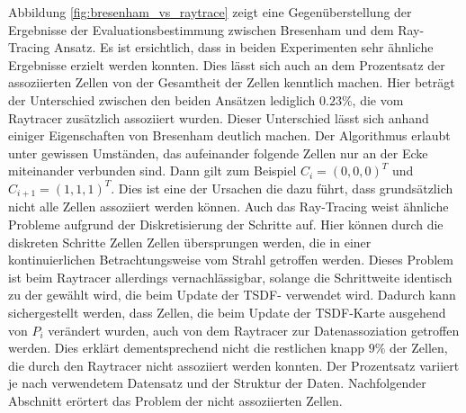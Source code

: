 Abbildung \ref{fig:bresenham_vs_raytrace} zeigt eine Gegenüberstellung der Ergebnisse der Evaluationsbestimmung zwischen Bresenham und dem Ray-Tracing Ansatz. Es ist ersichtlich, dass in beiden Experimenten sehr ähnliche Ergebnisse erzielt werden konnten. Dies lässt sich auch an dem Prozentsatz der assoziierten Zellen von der Gesamtheit der Zellen kenntlich machen. Hier beträgt der Unterschied zwischen den beiden Ansätzen lediglich $0.23 \%$, die vom Raytracer zusätzlich assoziiert wurden. Dieser Unterschied lässt sich anhand einiger Eigenschaften von Bresenham deutlich machen. Der Algorithmus erlaubt unter gewissen Umständen, das aufeinander folgende Zellen nur an der Ecke miteinander verbunden sind. Dann gilt zum Beispiel  $C_i = (0,0,0)^T$ und $C_{i+1} = (1,1,1)^T$. Dies ist eine der Ursachen die dazu führt, dass grundsätzlich nicht alle Zellen assoziiert werden können. Auch das Ray-Tracing weist ähnliche Probleme aufgrund der Diskretisierung der Schritte auf. Hier können durch die diskreten Schritte Zellen Zellen übersprungen werden, die in einer kontinuierlichen Betrachtungsweise vom Strahl getroffen werden. Dieses Problem ist beim Raytracer allerdings vernachlässigbar, solange die Schrittweite identisch zu der gewählt wird, die beim Update der TSDF- verwendet wird. Dadurch kann sichergestellt werden, dass Zellen, die beim Update der TSDF-Karte ausgehend von $P_i$ verändert wurden, auch von dem Raytracer zur Datenassoziation getroffen werden. Dies erklärt dementsprechend nicht die restlichen knapp $9\%$ der Zellen, die durch den Raytracer nicht assoziiert werden konnten. Der Prozentsatz variiert je nach verwendetem Datensatz und der Struktur der Daten. Nachfolgender Abschnitt erörtert das Problem der nicht assoziierten Zellen.


